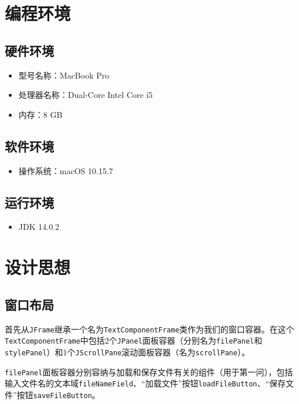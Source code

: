 \documentclass[11pt]{homework}
\begin{document}
\maketitle

\section*{编程环境}

  \subsection*{硬件环境}
  \begin{itemize}
    \item 型号名称：MacBook Pro
    \item 处理器名称：Dual-Core Intel Core i5
    \item 内存：8 GB
  \end{itemize}

  \subsection*{软件环境}
  \begin{itemize}
    \item 操作系统：macOS 10.15.7
  \end{itemize}

  \subsection*{运行环境}
  \begin{itemize}
    \item JDK 14.0.2
  \end{itemize}

\section*{设计思想}

  \subsection*{窗口布局}
  首先从\verb|JFrame|继承一个名为\verb|TextComponentFrame|类作为我们的窗口容器。在这个\verb|TextComponentFrame|中包括2个\verb|JPanel|面板容器（分别名为\verb|filePanel|和\verb|stylePanel|）和1个\verb|JScrollPane|滚动面板容器（名为\verb|scrollPane|）。

  \verb|filePanel|面板容器分别容纳与加载和保存文件有关的组件（用于第一问），包括输入文件名的文本域\verb|fileNameField|、“加载文件”按钮\verb|loadFileButton|、“保存文件”按钮\verb|saveFileButton|。
\end{document}
